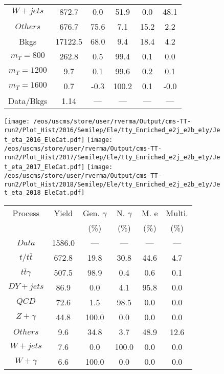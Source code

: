 \begin{figure}
\begin{minipage}[c]{0.32\textwidth}
{\begin{tabular}{cccccc}
$ W+jets $ &  872.7 &  0.0 &  51.9 &  0.0 &  48.1\\
$ Others $ &  676.7 &  75.6 &  7.1 &  15.2 &  2.2\\
Bkgs &  17122.5 &  68.0 &  9.4 &  18.4 &  4.2\\
$ m_{T} = 800 $ &  262.8 &  0.5 &  99.4 &  0.1 &  0.0\\
$ m_{T} = 1200 $ &  9.7 &  0.1 &  99.6 &  0.2 &  0.1\\
$ m_{T} = 1600 $ &  0.7 &  -0.3 &  100.2 &  0.1 &  -0.0\\
Data/Bkgs &  1.14 &  --- &  --- &  --- &  ---\\
\hline
\end{tabular}
}
\end{minipage}
\end{figure}

\begin{figure}
\centering
\texttt{[image: /eos/uscms/store/user/rverma/Output/cms-TT-run2/Plot\_Hist/2016/Semilep/Ele/tty\_Enriched\_e2j\_e2b\_e1y/Jet\_eta\_2016\_EleCat.pdf]}
\texttt{[image: /eos/uscms/store/user/rverma/Output/cms-TT-run2/Plot\_Hist/2017/Semilep/Ele/tty\_Enriched\_e2j\_e2b\_e1y/Jet\_eta\_2017\_EleCat.pdf]}
\texttt{[image: /eos/uscms/store/user/rverma/Output/cms-TT-run2/Plot\_Hist/2018/Semilep/Ele/tty\_Enriched\_e2j\_e2b\_e1y/Jet\_eta\_2018\_EleCat.pdf]}
\begin{minipage}[c]{0.32\textwidth}
\centering
\tiny{
\begin{tabular}{cccccc}
\hline
Process & Yield & Gen. $\gamma$ & N. $\gamma$ & M. e & Multi. \\
 &  & (\%) & (\%) & (\%) & (\%)  \\
\hline
                                                                      $ Data $ &  1586.0 &  --- &  --- &  --- &  ---\\
$ t/t\bar{t} $ &  672.8 &  19.8 &  30.8 &  44.6 &  4.7\\
$ t\bar{t}\gamma $ &  507.5 &  98.9 &  0.4 &  0.6 &  0.1\\
$ DY+jets $ &  86.9 &  0.0 &  4.1 &  95.8 &  0.0\\
$ QCD $ &  72.6 &  1.5 &  98.5 &  0.0 &  0.0\\
$ Z+\gamma $ &  44.8 &  100.0 &  0.0 &  0.0 &  0.0\\
$ Others $ &  9.6 &  34.8 &  3.7 &  48.9 &  12.6\\
$ W+jets $ &  7.6 &  0.0 &  100.0 &  0.0 &  0.0\\
$ W+\gamma $ &  6.6 &  100.0 &  0.0 &  0.0 &  0.0\\

\end{tabular}}
\end{minipage}
\end{figure}
